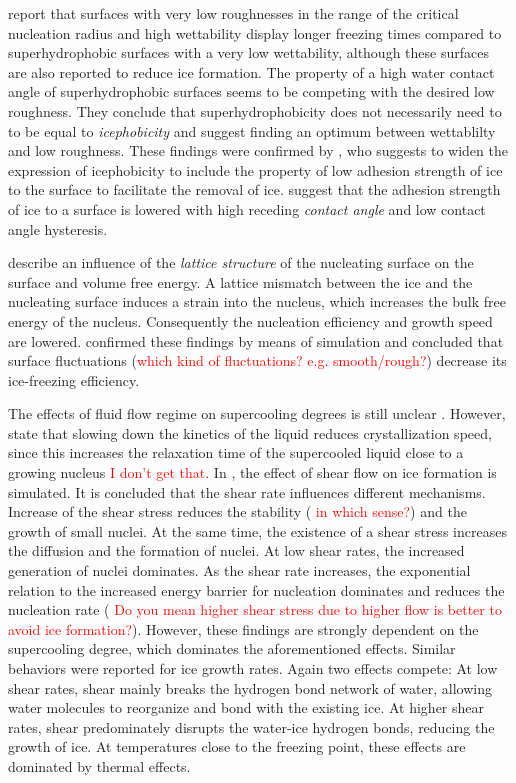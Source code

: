 \cite{jung_are_2011} report that surfaces with very low roughnesses in the range of the critical nucleation radius and high wettability display longer freezing times compared to superhydrophobic surfaces with a very low wettability, although these surfaces are also reported to reduce ice formation. The property of a high water contact angle of superhydrophobic surfaces seems to be competing with the desired low roughness. They conclude that superhydrophobicity does not necessarily need to to be equal to \emph{icephobicity} and suggest finding an optimum between wettablilty and low roughness. 
These findings were confirmed by \cite{hejazi_superhydrophobicity_2013}, who suggests to widen the expression of icephobicity to include the property of low adhesion strength of ice to the surface to facilitate the removal of ice. \cite{janjua_performance_2017} suggest that the adhesion strength of ice to a surface is lowered with high receding \emph{contact angle} and low contact angle hysteresis.

\cite{kauffeld_handbooks_2005} describe an influence of the \emph{lattice structure} of the nucleating surface on the surface and volume free energy. A lattice mismatch between the ice and the nucleating surface induces a strain into the nucleus, which increases the bulk free energy of the nucleus. Consequently the nucleation efficiency and growth speed are lowered. \cite{qiu_ice_2017} confirmed these findings by means of simulation and concluded that surface fluctuations (\textcolor{red}{which kind of fluctuations? e.g. smooth/rough?}) decrease its ice-freezing efficiency.  

The effects of fluid flow regime on supercooling degrees is still unclear \citep{kauffeld_ice_2019}. 
However, \cite{ronceray_suppression_2017} state that slowing down the kinetics of the liquid reduces crystallization speed, since this increases the relaxation time of the supercooled liquid close to a growing nucleus \textcolor{red}{I don't get that}.
In \cite{Luo_homogeneous_2020,Luo_ice_2019}, the effect of shear flow on ice formation is simulated. It is concluded that the shear rate influences different mechanisms. Increase of the shear stress reduces the stability ( \textcolor{red}{in which sense?}) and the growth of small nuclei. At the same time, the existence of a shear stress increases the diffusion and the formation of nuclei. At low shear rates, the increased generation of nuclei dominates. As the shear rate increases, the exponential relation to the increased energy barrier for nucleation dominates and reduces the nucleation rate ( \textcolor{red}{Do you mean higher shear stress due to higher flow is better to avoid ice formation?}). However, these findings are strongly dependent on the supercooling degree, which dominates the aforementioned effects. Similar behaviors were reported for ice growth rates. Again two effects compete: At low shear rates, shear mainly breaks the hydrogen bond network of water, allowing water molecules to reorganize and bond with the existing ice. At higher shear rates, shear predominately disrupts the water-ice hydrogen bonds, reducing the growth of ice. At temperatures close to the freezing point, these effects are dominated by thermal effects.



